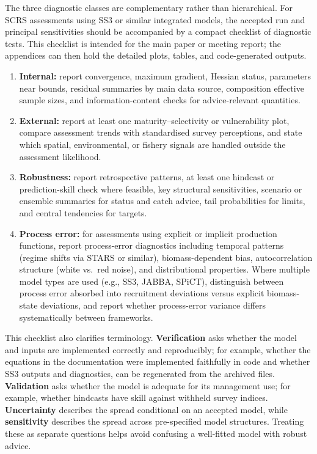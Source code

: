 \documentclass[11pt,a4paper]{article}
\begin{document}
The three diagnostic classes are complementary rather than hierarchical. For SCRS assessments using SS3 or similar integrated models, the accepted run and principal sensitivities should be accompanied by a compact checklist of diagnostic tests. This checklist is intended for the main paper or meeting report; the appendices can then hold the detailed plots, tables, and code-generated outputs.

\begin{enumerate}
  \item \textbf{Internal:} report convergence, maximum gradient, Hessian status, parameters near bounds, residual summaries by main data source, composition effective sample sizes, and information-content checks for advice-relevant quantities.
  \item \textbf{External:} report at least one maturity--selectivity or vulnerability plot, compare assessment trends with standardised survey perceptions, and state which spatial, environmental, or fishery signals are handled outside the assessment likelihood.
  \item \textbf{Robustness:} report retrospective patterns, at least one hindcast or prediction-skill check where feasible, key structural sensitivities, scenario or ensemble summaries for status and catch advice, tail probabilities for limits, and central tendencies for targets.
  \item \textbf{Process error:} for assessments using explicit or implicit production functions, report process-error diagnostics including temporal patterns (regime shifts via STARS or similar), biomass-dependent bias, autocorrelation structure (white vs.\ red noise), and distributional properties. Where multiple model types are used (e.g., SS3, JABBA, SPiCT), distinguish between process error absorbed into recruitment deviations versus explicit biomass-state deviations, and report whether process-error variance differs systematically between frameworks.
\end{enumerate}

This checklist also clarifies terminology. \textbf{Verification} asks whether the model and inputs are implemented correctly and reproducibly; for example, whether the equations in the documentation were implemented faithfully in code and whether SS3 outputs and diagnostics, can be regenerated from the archived files. \textbf{Validation} asks whether the model is adequate for its management use; for example, whether hindcasts have skill against withheld survey indices. \textbf{Uncertainty} describes the spread conditional on an accepted model, while \textbf{sensitivity} describes the spread across pre-specified model structures. Treating these as separate questions helps avoid confusing a well-fitted model with robust advice.
\end{document}
